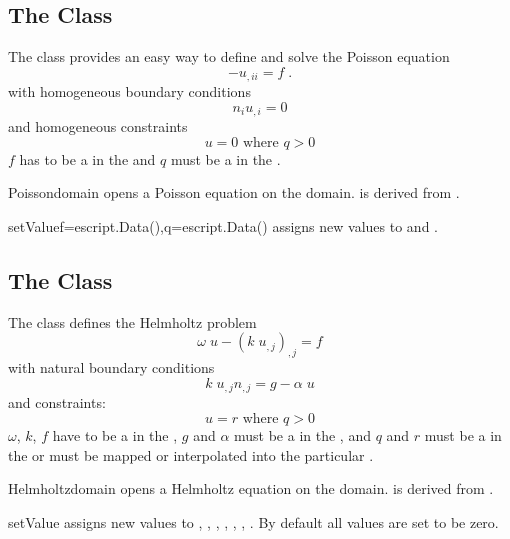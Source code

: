 \subsection{The \Poisson Class}
The \Poisson class provides an easy way to define and solve the Poisson
equation
\begin{equation}\label{POISSON.1}
-u_{,ii}=f\; .
\end{equation}
with homogeneous boundary conditions
\begin{equation}\label{POISSON.2}
n_{i}u_{,i}=0
\end{equation}
and homogeneous constraints
\begin{equation}\label{POISSON.3}
u=0 \mbox{ where } q>0
\end{equation}
$f$ has to be a \Scalar in the \Function and $q$ must be
a \Scalar in  the \SolutionFS.

\begin{classdesc}{Poisson}{domain}
opens a Poisson equation on the \Domain domain. \Poisson is derived from \LinearPDE.
\end{classdesc}
\begin{methoddesc}[Poisson]{setValue}{f=escript.Data(),q=escript.Data()}
assigns new values to  and .
\end{methoddesc}

\subsection{The \Helmholtz Class}
The \Helmholtz class defines the Helmholtz problem
\begin{equation}\label{HZ.1}
\omega \; u - (k\; u_{,j})_{,j} = f
\end{equation}
 with natural boundary conditions
\begin{equation}\label{HZ.2}
k\; u_{,j} n_{,j} = g- \alpha \; u 
\end{equation}
and constraints:
\begin{equation}\label{HZ.3}
u=r \mbox{ where } q>0
\end{equation}
$\omega$, $k$, $f$ have to be a \Scalar in the \Function,
$g$ and $\alpha$ must be a \Scalar in  the \FunctionOnBoundary,
and $q$ and $r$ must be a \Scalar in  the \SolutionFS or must be mapped or interpolated into the particular \FunctionSpace.

\begin{classdesc}{Helmholtz}{domain}
opens a Helmholtz equation on the \Domain domain. \Helmholtz is derived from \LinearPDE.
\end{classdesc}
\begin{methoddesc}[Helmholtz]{setValue}{       }
assigns new values to , , , , , , . By default all values are set to be zero.
\end{methoddesc}

